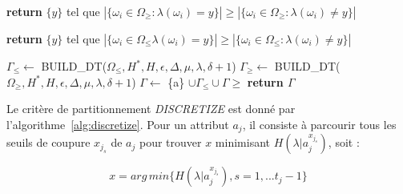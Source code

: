 \documentclass[a4paper]{article}
\begin{document}
\begin{algorithm}[H]
\begin{algorithmic}
	\State \textbf{return} $\{y\}$ tel que $|\{\omega_i \in \Omega_{\geq}: \lambda(\omega_i) = y\}| \geq |\{\omega_i \in \Omega_{\geq}: \lambda(\omega_i) \neq y\}|$
\EndIf

	\State \textbf{return} $\{y\}$ tel que $|\{\omega_i \in \Omega_{\leq} \lambda(\omega_i) = y\}| \geq |\{\omega_i \in \Omega_{\leq}: \lambda(\omega_i) \neq y\}|$
\EndIf

\State $\Gamma_{\leq}\gets$ BUILD\_DT($\Omega_{\leq}, H^*, H, \epsilon, \Delta, \mu, \lambda, \delta +1$)
\State $\Gamma_{\geq}\gets$ BUILD\_DT($\Omega_{\geq}, H^*, H, \epsilon, \Delta, \mu, \lambda, \delta +1$)
\State $\Gamma\gets$ \{a\} $\cup \Gamma_{\leq} \cup \Gamma{\geq}$
\State \textbf{return $\Gamma$} 

\EndProcedure
\end{algorithmic}
\end{algorithm}

Le critère de partitionnement \textit{DISCRETIZE} est donné par l'algorithme~\ref{alg:discretize}.
Pour un attribut $a_j$, il consiste à parcourir tous les seuils de coupure
$x_{j_s}$ de $a_j$ pour trouver $x$ minimisant $H(\lambda|a^{x_{j_s}}_j)$, soit :

$$ x = arg\,min \{H(\lambda|a^{x_{j_s}}_j), s=1,...t_j -1\}$$
\end{document}
